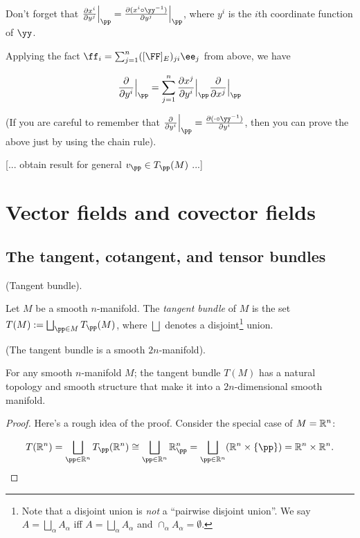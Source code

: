 \begin{theorem}
    Don't forget that $\frac{\pd x^i}{\pd y^j}\Big|_\pp = \frac{\pd (x^i \circ \yy^{-1})}{\pd y^j}\Big|_\pp$, where $y^i$ is the $i$th coordinate function of $\yy$.
    
    Applying the fact $\ff_i = \sum_{j = 1}^n ([\FF]_E)_{ji} \ee_j$ from above, we have
    
    \begin{align*}
        \frac{\pd}{\pd y^i}\Big|_\pp
        =
        \sum_{j = 1}^n \frac{\pd x^j}{\pd y^i}\Big|_\pp \frac{\pd}{\pd x^j}\Big|_\pp
    \end{align*}
    
    (If you are careful to remember that $\frac{\pd}{\pd y^i}\Big|_\pp = \frac{\pd (\cdot \circ \yy^{-1})}{\pd y^i}$, then you can prove the above just by using the chain rule). 

    [... obtain result for general $v_\pp \in T_\pp(M)$ ...]
\end{theorem}

\section{Vector fields and covector fields}

\subsection*{The tangent, cotangent, and tensor bundles}

\begin{defn}
     (Tangent bundle).
    
    Let $M$ be a smooth $n$-manifold. The \textit{tangent bundle} of $M$ is the set $T(M) := \bigsqcup_{\pp \in M} T_\pp(M)$, where $\bigsqcup$ denotes a disjoint\footnote{Note that a disjoint union is \textit{not} a ``pairwise disjoint union''. We say $A = \bigsqcup_\alpha A_\alpha$ iff $A = \bigsqcup_\alpha A_\alpha$ and $\cap_\alpha A_\alpha = \emptyset$.} union.
\end{defn}

\begin{theorem}
     (The tangent bundle is a smooth $2n$-manifold).
    
    For any smooth $n$-manifold $M$; the tangent bundle $T(M)$ has a natural topology and smooth structure that make it into a $2n$-dimensional smooth manifold.
\end{theorem}

\begin{proof}
    Here's a rough idea of the proof. Consider the special case of $M = \mathbb{R}^n$:
        
    \begin{align*}
        T(\R^n) = \bigsqcup_{\pp \in \R^n} T_\pp(\R^n) \cong \bigsqcup_{\pp \in \R^n} \R^n_\pp = \bigsqcup_{\pp \in \R^n} ( \R^n \times \{\pp\}) = \R^n \times \R^n.
    \end{align*}
\end{proof}


